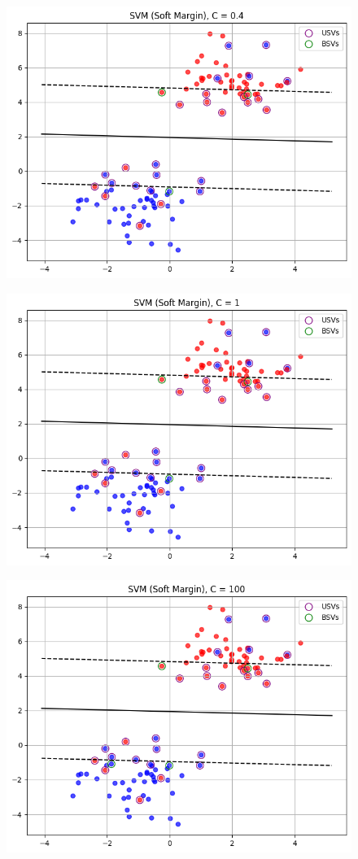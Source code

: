 \begin{enumerate}
\begin{figure}[H]
        \caption {}
    \end{figure}
    \begin{figure}[H]
        \centering
        \includegraphics[width=0.75\linewidth]{assets/2.3.png}
        \caption {}
    \end{figure}
    \begin{figure}[H]
        \centering
        \includegraphics[width=0.75\linewidth]{assets/2.4.png}
        \caption {}
    \end{figure}
    \begin{figure}[H]
        \centering
        \includegraphics[width=0.75\linewidth]{assets/2.5.png}

\end{figure}
\end{enumerate}
